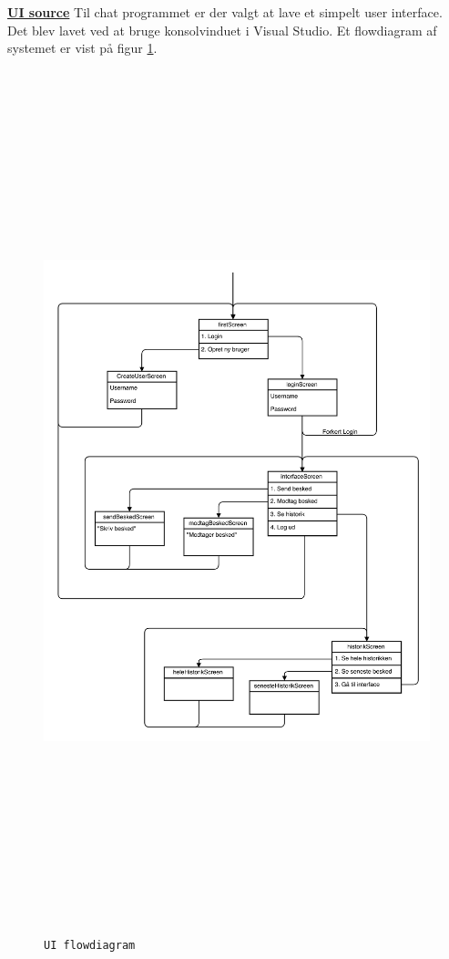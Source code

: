 \hfill \break
\underline{\textbf{UI source}}
\newline
Til chat programmet er der valgt at lave et simpelt user interface. Det blev lavet ved at bruge konsolvinduet i Visual Studio. Et flowdiagram af systemet er vist på figur \ref{fig:uif}.
\begin{figure}[ht]
	\centering
	\includegraphics[width=15cm,height=25cm,keepaspectratio]{pictures/UIflow.png}
	\caption{\texttt{UI flowdiagram}}
	\label{fig:uif}
\end{figure}
